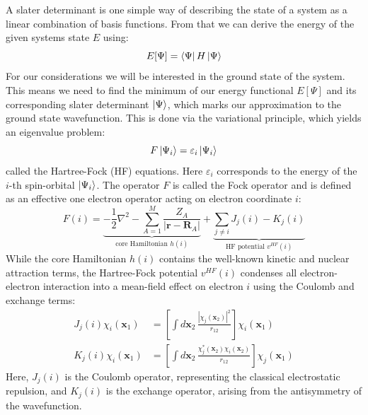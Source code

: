 A slater determinant is one simple way of describing the state of a system as a linear combination of basis functions. From that we can derive the energy of the given systems state $E$ using: 
\begin{equation}
    \label{eq:elec_energy}
    E[\Psi] = \bra{\Psi} H \ket{\Psi}
\end{equation}
For our considerations we will be interested in the ground state of the system. This means we need to find the minimum of our energy functional $E[\Psi]$ and its corresponding slater determinant $\ket{\Psi}$, which marks our approximation to the ground state wavefunction. This is done via the variational principle, which yields an eigenvalue problem: 
\begin{equation}
    \label{eq:hf_eigenval_equation}
    F \ket{\Psi_i} = \varepsilon_i \ket{\Psi_i}
\end{equation}
called the Hartree-Fock (HF) equations. Here $\varepsilon_i$ corresponds to the energy of the $i$-th spin-orbital $\ket{\Psi_i}$. The operator $F$ is called the Fock operator and is defined as an effective one electron operator acting on electron coordinate $i$:
\begin{equation}
    F(i) = 
    \underbrace{
        -\frac{1}{2} \nabla^2 
        - \sum_{A=1}^M \frac{Z_A}{|\mathbf{r} - \mathbf{R}_A|}
    }_{\text{core Hamiltonian } h(i)}
    + 
    \underbrace{
        \sum_{j\neq i} J_j(i) - K_j(i)
    }_{\text{HF potential }v^{HF}(i)}
\end{equation}
While the core Hamiltonian $h(i)$ contains the well-known kinetic and nuclear attraction terms, the Hartree-Fock potential $v^{HF}(i)$ condenses all electron-electron interaction into a mean-field effect on electron $i$ using the Coulomb and exchange terms:
\begin{subequations}
\begin{align}
    J_j(i)\chi_i(\mathbf{x}_1) &= \left[ \int d\mathbf{x}_2\, \frac{|\chi_j(\mathbf{x}_2)|^2}{r_{12}} \right] \chi_i(\mathbf{x}_1) \\
    K_j(i)\chi_i(\mathbf{x}_1) &= \left[ \int d\mathbf{x}_2\, \frac{\chi_j^*(\mathbf{x}_2)\chi_i(\mathbf{x}_2)}{r_{12}} \right] \chi_j(\mathbf{x}_1)
\end{align}
\end{subequations}
Here, $J_j(i)$ is the Coulomb operator, representing the classical electrostatic repulsion, and $K_j(i)$ is the exchange operator, arising from the antisymmetry of the wavefunction.

